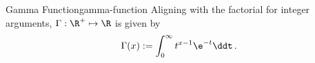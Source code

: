 \begin{definition}{Gamma Function}{gamma-function}
  Aligning with the factorial for integer arguments, $\Gamma: \R^+ \mapsto \R$ is given by
  $$\Gamma(x) := \int_0^\infty t^{x-1}\e^{-t} \ddt\,.$$
\end{definition}

